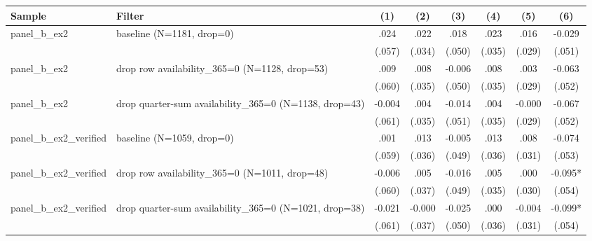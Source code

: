 \begin{tabular}{llcccccc}
\hline
Sample & Filter & (1) & (2) & (3) & (4) & (5) & (6) \\
\hline
panel\_b\_ex2 & baseline (N=1181, drop=0) & .024 & .022 & .018 & .023 & .016 & -0.029
\\
 &  & (.057) & (.034) & (.050) & (.035) & (.029) & (.051)
\\
panel\_b\_ex2 & drop row availability\_365=0 (N=1128, drop=53) & .009 & .008 & -0.006 & .008 & .003 & -0.063
\\
 &  & (.060) & (.035) & (.050) & (.035) & (.029) & (.052)
\\
panel\_b\_ex2 & drop quarter-sum availability\_365=0 (N=1138, drop=43) & -0.004 & .004 & -0.014 & .004 & -0.000 & -0.067
\\
 &  & (.061) & (.035) & (.051) & (.035) & (.029) & (.052)
\\
panel\_b\_ex2\_verified & baseline (N=1059, drop=0) & .001 & .013 & -0.005 & .013 & .008 & -0.074
\\
 &  & (.059) & (.036) & (.049) & (.036) & (.031) & (.053)
\\
panel\_b\_ex2\_verified & drop row availability\_365=0 (N=1011, drop=48) & -0.006 & .005 & -0.016 & .005 & .000 & -0.095*
\\
 &  & (.060) & (.037) & (.049) & (.035) & (.030) & (.054)
\\
panel\_b\_ex2\_verified & drop quarter-sum availability\_365=0 (N=1021, drop=38) & -0.021 & -0.000 & -0.025 & .000 & -0.004 & -0.099*
\\
 &  & (.061) & (.037) & (.050) & (.036) & (.031) & (.054)
\\
\hline
\end{tabular}

